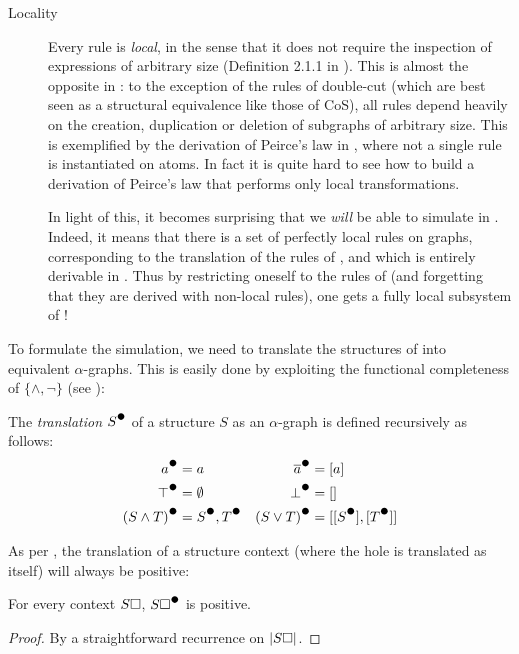 \begin{description}
  \item[Locality]
    Every rule is \emph{local}, in the sense that it does not require the
    inspection of expressions of arbitrary size (Definition 2.1.1 in
    \cite{tubella:hal-02390267}). This is almost the opposite in : to
    the exception of the rules of double-cut (which are best seen as a
    structural equivalence like those of CoS), all rules depend heavily on the
    creation, duplication or deletion of subgraphs of arbitrary size. This is
    exemplified by the derivation of Peirce's law in ,
    where not a single rule is instantiated on atoms. In fact it is quite hard
    to see how to build a derivation of Peirce's law that performs only local
    transformations.
    
    In light of this, it becomes surprising that we \emph{will} be able to
    simulate  in . Indeed, it means that there is a set
     of perfectly local rules on graphs, corresponding to the
    translation of the rules of , and which is entirely derivable in
    . Thus by restricting oneself to the rules of 
    (and forgetting that they are derived with non-local rules), one gets a
    fully local subsystem of !
\end{description}

To formulate the simulation, we need to translate the structures of 
into equivalent $\alpha$-graphs. This is easily done by exploiting the
functional completeness of $\{\land, \neg\}$ (see ):

\begin{definition}
  The \emph{translation} $\strans{S}$ of a structure $S$ as an $\alpha$-graph is
  defined recursively as follows:
  \begin{align*}
    \strans{a} &= a & \strans{\dmdual{a}} &= [a] \\
    \strans{\top} &= \emptyset & \strans{\bot} &= [] \\
    \strans{(S \land T)} &= \strans{S}, \strans{T} & \strans{(S \lor T)} &= [[\strans{S}], [\strans{T}]]
  \end{align*}
\end{definition}

As per , the translation of a structure context (where
the hole is translated as itself) will always be positive:

\begin{fact}
  For every context $S\square$, $\strans{S\hole}$ is positive.
\end{fact}
\begin{proof}
  By a straightforward recurrence on $\left|S\square\right|$.
\end{proof}

